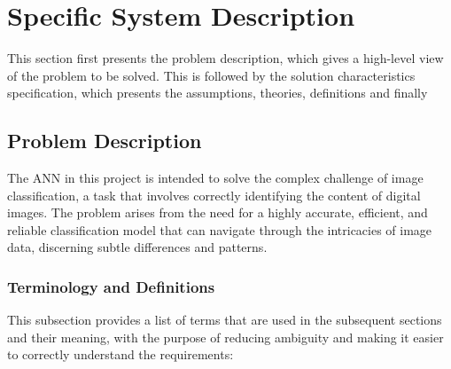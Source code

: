 \documentclass[12pt]{article}
\begin{document}
\section{Specific System Description}

This section first presents the problem description, which gives a high-level
view of the problem to be solved.  This is followed by the solution characteristics
specification, which presents the assumptions, theories, definitions and finally

\subsection{Problem Description} \label{Sec_pd}

The ANN in this project is intended to solve the complex challenge of image classification, 
a task that involves correctly identifying the content of digital images. The problem arises 
from the need for a highly accurate, efficient, and reliable classification model that can 
navigate through the intricacies of image data, discerning subtle differences and patterns.  

\subsubsection{Terminology and  Definitions}


This subsection provides a list of terms that are used in the subsequent
sections and their meaning, with the purpose of reducing ambiguity and making it
easier to correctly understand the requirements:
\end{document}
